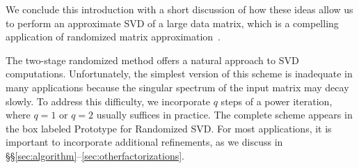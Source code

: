 \documentclass[final]{siamltex}
\newcounter{algorithm}[section]
\newcommand{\pgnotate}[1]{{\color{blue}[#1]}}
\begin{document}
We conclude this introduction with a short discussion of how these ideas allow
us to perform an approximate SVD of a large data matrix,
which is a compelling application of randomized matrix approximation~\cite{tygert_szlam}.




The two-stage randomized method offers a natural approach to SVD computations.
Unfortunately, the simplest version of this scheme is inadequate in many
applications because the singular spectrum of the input matrix may decay
slowly.  To address this difficulty, we incorporate $q$ steps of a power
iteration, where $q = 1$ or $q = 2$ usually suffices in practice.  The
complete scheme appears in the box labeled Prototype for Randomized SVD.
For most applications, it is important to incorporate additional refinements,
as we discuss in \S\S\ref{sec:algorithm}--\ref{sec:otherfactorizations}.
\end{document}
